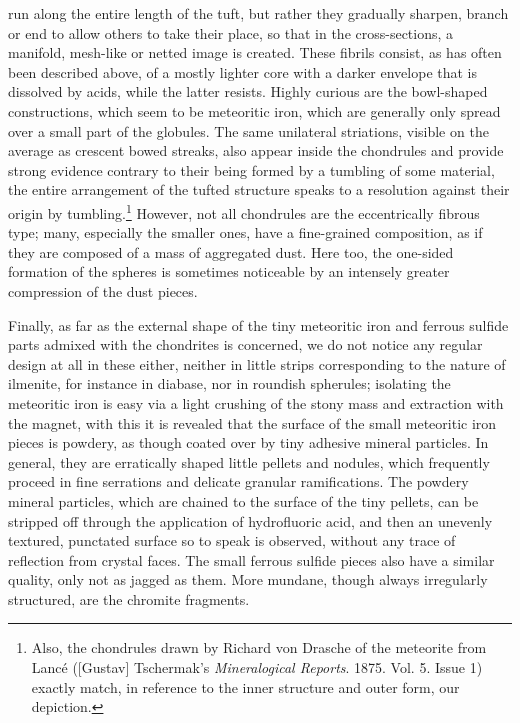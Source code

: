 \documentclass[a4paper, 12pt, oneside]{article}
\begin{document}
run along the entire length of the tuft, but rather they gradually sharpen, branch or end to allow others to take their place, so that in the cross-sections, a manifold, mesh-like or netted image is created. These fibrils consist, as has often been described above, of a mostly lighter core with a darker envelope that is dissolved by acids, while the latter resists. Highly curious are the bowl-shaped constructions, which seem to be meteoritic iron, which are generally only spread over a small part of the globules. The same unilateral striations, visible on the average as crescent bowed streaks, also appear inside the chondrules and provide strong evidence contrary to their being formed by a tumbling of some material, the entire arrangement of the tufted structure speaks to a resolution against their origin by tumbling.\footnote{Also, the chondrules drawn by Richard von Drasche of the meteorite from Lancé ([Gustav] Tschermak's \emph{Mineralogical Reports}. 1875. Vol. 5. Issue 1) exactly match, in reference to the inner structure and outer form, our depiction.} However, not all chondrules are the eccentrically fibrous type; many, especially the smaller ones, have a fine-grained composition, as if they are composed of a mass of aggregated dust. Here too, the one-sided formation of the spheres is sometimes noticeable by an intensely greater compression of the dust pieces.

Finally, as far as the external shape of the tiny meteoritic iron and ferrous sulfide parts admixed with the chondrites is concerned, we do not notice any regular design at all in these either, neither in little strips corresponding to the nature of ilmenite, for instance in diabase, nor in roundish spherules; isolating the meteoritic iron is easy via a light crushing of the stony mass and extraction with the magnet, with this it is revealed that the surface of the small meteoritic iron pieces is powdery, as though coated over by tiny adhesive mineral particles. In general, they are erratically shaped little pellets and nodules, which frequently proceed in fine serrations and delicate granular ramifications. The powdery mineral particles, which are chained to the surface of the tiny pellets, can be stripped off through the application of hydrofluoric acid, and then an unevenly textured, punctated surface so to speak is observed, without any trace of reflection from crystal faces. The small ferrous sulfide pieces also have a similar quality, only not as jagged as them. More mundane, though always irregularly structured, are the chromite fragments.
\end{document}
